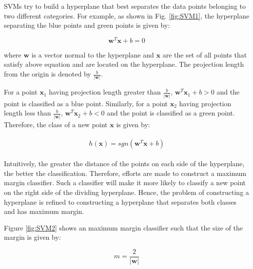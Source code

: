 %


SVMs try to build a hyperplane that best separates the data points belonging to two different categories. For example, as shown in Fig. \ref{fig:SVM1}, the hyperplane separating the blue points and green points is given by:

$$
\mathbf{w}^{T}\mathbf{x} + b = 0
$$

where $\mathbf{w}$ is a vector normal to the hyperplane and $\mathbf{x}$ are the set of all points that satisfy above equation and are located on the hyperplane. The projection length from the origin is denoted by $\frac{b}{|\mathbf{w}|}$. %

For a point $\mathbf{x}_1$ having projection length greater than $\frac{b}{|\mathbf{w}|}$, $\mathbf{w}^{T}\mathbf{x}_1 + b > 0$ and the point is classified as a blue point. Similarly, for a point $\mathbf{x}_2$ having projection length less than $\frac{b}{|\mathbf{w}|}$, $\mathbf{w}^{T}\mathbf{x}_2 + b < 0$ and the point is classified as a green point. Therefore, the class of a new point $\mathbf{x}$ is given by:

\begin{align}
\begin{aligned}
h(\mathbf{x}) = sgn(\mathbf{w}^{T}\mathbf{x} + b) \label{eq:sgn}
\end{aligned}
\end{align}

Intuitively, the greater the distance of the points on each side of the hyperplane, the better the classification. Therefore, efforts are made to construct a maximum margin classifier.  Such a classifier will make it more likely to classify a new point on the right side of the dividing hyperplane. Hence, the problem of constructing a hyperplane is refined to constructing a hyperplane that separates both classes and has maximum margin.

Figure \ref{fig:SVM2} shows an maximum margin classifier such that the size of the margin is given by:

$$
m=\frac{2}{|\mathbf{w}|}
$$

